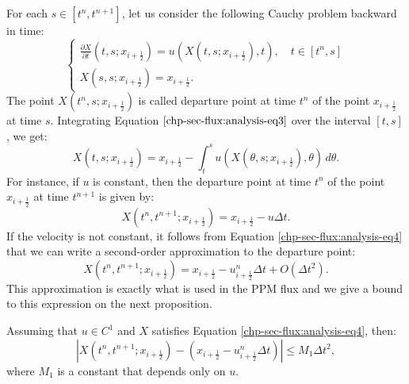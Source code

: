For each $s \in [t^n,t^{n+1}]$, let us consider the following Cauchy problem
backward in time:
\begin{equation}
	\label{chp-sec-flux:analysis-eq3}
    	\begin{cases}
				\frac{\partial X}{\partial t} (t,s;x_{i+\frac{1}{2}}) = u(X(t,s;x_{i+\frac{1}{2}}) ,t),\quad t\in[t^{n},s] \\
				X(s,s;x_{i+\frac{1}{2}}) = x_{i+\frac{1}{2}}.
    	\end{cases}
\end{equation}
The point $X(t^n,s;x_{i+\frac{1}{2}})$ is called departure point at time $t^n$
of the point $x_{i+\frac{1}{2}}$ at time $s$.
Integrating Equation $\eqref{chp-sec-flux:analysis-eq3}$ over the interval
$[t,s]$, we get:
\begin{equation}
	\label{chp-sec-flux:analysis-eq4}
	X(t,s;x_{i+\frac{1}{2}}) = x_{i+\frac{1}{2}} - \int_{t}^{s}u(X(\theta,s;x_{i+\frac{1}{2}}),\theta) \,d\theta.
\end{equation}
For instance, if $u$ is constant, then the departure point at time $t^n$ of the point 
$x_{i+\frac{1}{2}}$ at time $t^{n+1}$ is given by:
\begin{equation}
	\label{chp-sec-flux:departurepoint}
	X(t^n,t^{n+1};x_{i+\frac{1}{2}}) = x_{i+\frac{1}{2}} - u\Delta t.
\end{equation}
If the velocity is not constant, it follows from Equation \eqref{chp-sec-flux:analysis-eq4}
that  we can write a second-order approximation to the departure point: 
\begin{equation}
	\label{chp-sec-flux:departurepoint2}
	X(t^n,t^{n+1};x_{i+\frac{1}{2}}) = x_{i+\frac{1}{2}} - u^{n}_{i+\frac{1}{2}}\Delta t + O(\Delta t^2).
\end{equation}
This approximation is exactly what is used in the PPM flux and we give a bound 
to this expression on the next proposition.
\begin{prop}
	Assuming that $u \in C^1$ and $X$ satisfies Equation \eqref{chp-sec-flux:analysis-eq4}, then:
\begin{equation}
	\label{chp-sec-flux:departurepoint3}
	|X(t^n,t^{n+1};x_{i+\frac{1}{2}}) - (x_{i+\frac{1}{2}} - u^{n}_{i+\frac{1}{2}}\Delta t)| \leq M_1 \Delta t^2,
\end{equation}
where $M_1$ is a constant that depends only on $u$. 
\end{prop}
